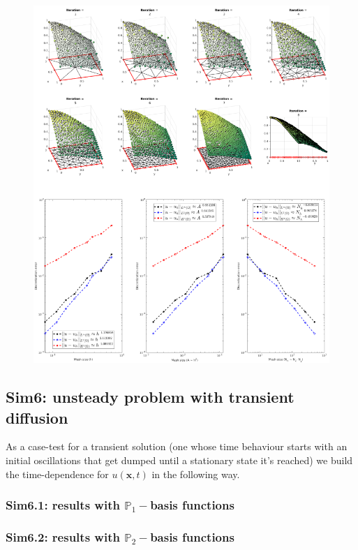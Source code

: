 \documentclass[12pt,openany,twoside,a4paper]{article}
\begin{document}
\begin{figure}[H]
    \centering
    \includegraphics[keepaspectratio,height=0.675\textheight]{sim5.2.png}
    \label{sim5.2}
\end{figure}

\newpage
\subsection{Sim6: unsteady problem with transient diffusion}
As a case-test for a transient solution (one whose time behaviour starts with an initial oscillations that get dumped until a stationary state it's reached) we build the time-dependence for $u(\mathbf{x},t)$ in the following way.
\subsubsection{Sim6.1: results with $\mathbb{P}_1-$basis functions}
\subsubsection{Sim6.2: results with $\mathbb{P}_2-$basis functions}
\end{document}
